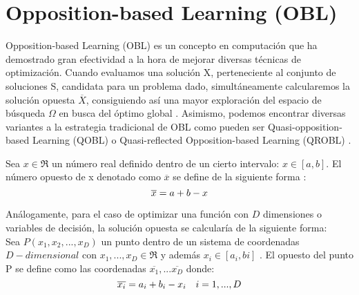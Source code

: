 

\section{Opposition-based Learning (OBL)}
\label{sec:OBL}

Opposition-based Learning (OBL) \cite{obl, obl2, OPSO, OPSO2} es un concepto en computación que ha demostrado gran efectividad a la hora de mejorar diversas técnicas de optimización. Cuando evaluamos una solución X, perteneciente al conjunto de soluciones S, candidata para un problema dado, simultáneamente  
 calcularemos la solución opuesta $\overline{X}$, consiguiendo así una mayor exploración del espacio de búsqueda $\Omega$ en busca del óptimo global \cite{obl}. Asimismo, podemos encontrar diversas variantes a la estrategia tradicional de OBL como pueden ser Quasi-opposition-based Learning (QOBL) o Quasi-reflected Opposition-based Learning (QROBL) \cite{Segredo2017}.

Sea $x \in \Re $  un número real definido dentro de un cierto intervalo: $x \in [a,b]$. El número opuesto de x denotado como $\overline{x}$ se define de la siguiente forma \cite{obl}: \\
 \begin{equation}
     \overline{x} = a + b - x  \\
 \end{equation}

Análogamente, para el caso de optimizar una función con $D$ dimensiones o variables de decisión, la solución opuesta se calcularía de la siguiente forma: \\

 Sea $ P(x_{1}, x_{2},...,x_{D}) $ un punto dentro de un sistema de coordenadas $D-dimensional$ con $ x_{1},...,x_{D} \in \Re$ y además $ x_{i} \in [a_{i}, b{i}]$ \cite{obl}. El opuesto del punto P se define como las coordenadas $\overline{x_{1}},...\overline{x_{D}}$ donde:\\
\begin{equation}
    \overline{x_{i}} = a_{i} + b_{i} - x_{i} \quad i = 1,...,D \\
\end{equation}

